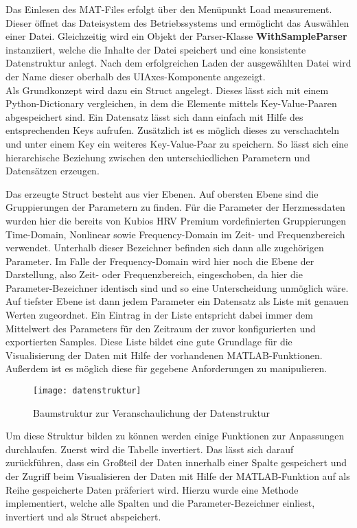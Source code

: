 Das Einlesen des MAT-Files erfolgt über den Menüpunkt \glqq Load measurement\grqq{}. Dieser öffnet das Dateisystem des Betriebssystems und ermöglicht das Auswählen einer Datei. Gleichzeitig wird ein Objekt der Parser-Klasse \textbf{WithSampleParser} instanziiert, welche die Inhalte der Datei speichert und eine konsistente Datenstruktur anlegt. Nach dem erfolgreichen Laden der ausgewählten Datei wird der Name dieser oberhalb des UIAxes-Komponente angezeigt.\\
Als Grundkonzept wird dazu ein Struct angelegt. Dieses lässt sich mit einem Python-Dictionary vergleichen, in dem die Elemente mittels Key-Value-Paaren abgespeichert sind. Ein Datensatz lässt sich dann einfach mit Hilfe des entsprechenden Keys aufrufen. Zusätzlich ist es möglich dieses zu verschachteln und unter einem Key ein weiteres Key-Value-Paar zu speichern. So lässt sich eine hierarchische Beziehung zwischen den unterschiedlichen Parametern und Datensätzen erzeugen.

Das erzeugte Struct besteht aus vier Ebenen. Auf obersten Ebene sind die Gruppierungen der Parametern zu finden. Für die Parameter der Herzmessdaten wurden hier die bereits von Kubios HRV Premium vordefinierten Gruppierungen Time-Domain, Nonlinear sowie Frequency-Domain im Zeit- und Frequenzbereich verwendet. Unterhalb dieser Bezeichner befinden sich dann alle zugehörigen Parameter. Im Falle der Frequency-Domain wird hier noch die Ebene der Darstellung, also Zeit- oder Frequenzbereich, eingeschoben, da hier die Parameter-Bezeichner identisch sind und so eine Unterscheidung unmöglich wäre. Auf tiefster Ebene ist dann jedem Parameter ein Datensatz als Liste mit genauen Werten zugeordnet. Ein Eintrag in der Liste entspricht dabei immer dem Mittelwert des Parameters für den Zeitraum der zuvor konfigurierten und exportierten Samples. Diese Liste bildet eine gute Grundlage für die Visualisierung der Daten mit Hilfe der vorhandenen MATLAB-Funktionen. Außerdem ist es möglich diese für gegebene Anforderungen zu manipulieren.

\begin{figure}[H]
	\centering
	\texttt{[image: datenstruktur]}
	\caption{Baumstruktur zur Veranschaulichung der Datenstruktur}
	\label{fig:datenstruktur}
\end{figure}

Um diese Struktur bilden zu können werden einige Funktionen zur Anpassungen durchlaufen. Zuerst wird die Tabelle invertiert. Das lässt sich darauf zurückführen, dass ein Großteil der Daten innerhalb einer Spalte gespeichert und der Zugriff beim Visualisieren der Daten mit Hilfe der MATLAB-Funktion auf als Reihe gespeicherte Daten präferiert wird. Hierzu wurde eine Methode implementiert, welche alle Spalten und die Parameter-Bezeichner einliest, invertiert und als Struct abspeichert.

